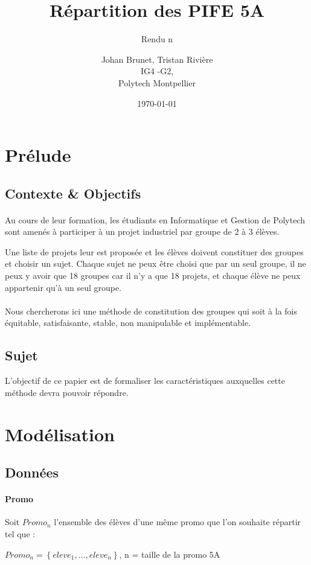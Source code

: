 \documentclass[10pt,a4paper]{scrartcl}
\title{Répartition des PIFE 5A}
\subtitle{Rendu n\degre3}
\author{Johan Brunet, Tristan Rivière\\
   IG4 -G2,\\
   Polytech Montpellier}
\date{\today}
\begin{document}
\maketitle
\section{Prélude}
\subsection{Contexte \& Objectifs}
\paragraph*{}
Au cours de leur formation, les étudiants en Informatique et Gestion de Polytech sont amenés à participer à un projet industriel par groupe de 2 à 3 élèves.

Une liste de projets leur est proposée et les élèves doivent constituer des groupes et choisir un sujet. Chaque sujet ne peux être choisi que par un seul groupe, il ne peux y avoir que 18 groupes car il n'y a que 18 projets, et chaque élève ne peux appartenir qu'à un seul groupe.
\paragraph*{}
Nous chercherons ici une méthode de constitution des groupes qui soit à la fois équitable, satisfaisante, stable, non manipulable et implémentable.
\subsection{Sujet}
L'objectif de ce papier est de formaliser les caractéristiques auxquelles cette méthode devra pouvoir répondre.

\section{Modélisation}
\subsection{Données}
\paragraph{Promo}Soit $Promo_{n}$ l'ensemble des élèves d'une même promo que l'on souhaite répartir tel que : \\
\begin{center}
	$Promo_{n}=\left\{ eleve_{1}, ..., eleve_{n} \right\}$, n = taille de la promo 5A
\end{center}
\end{document}
